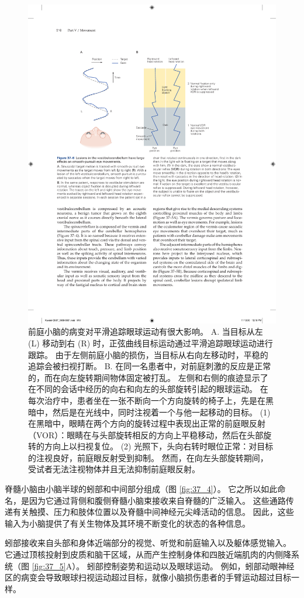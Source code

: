 \begin{figure}[htbp]
	\centering
	\includegraphics[width=0.8\linewidth]{chap37/fig_37_6}
	\caption{前庭小脑的病变对平滑追踪眼球运动有很大影响。 A. 当目标从左 (L) 移动到右 (R) 时，正弦曲线目标运动通过平滑追踪眼球运动进行跟踪。 由于左侧前庭小脑的损伤，当目标从右向左移动时，平稳的追踪会被扫视打断。 B. 在同一名患者中，对前庭刺激的反应是正常的，而在向左旋转期间物体固定被打乱。 左侧和右侧的痕迹显示了在不同的会话中经历的向右和向左的头部旋转引起的眼球运动。 在每次治疗中，患者坐在一张不断向一个方向旋转的椅子上，先是在黑暗中，然后是在光线中，同时注视着一个与他一起移动的目标。 (1) 在黑暗中，眼睛在两个方向的旋转过程中表现出正常的前庭眼反射（VOR）：眼睛在与头部旋转相反的方向上平稳移动，然后在头部旋转的方向上以扫视复位。 (2) 光照下，头向右转时眼位正常：对目标的注视良好，前庭眼反射受到抑制。 然而，在向左头部旋转期间，受试者无法注视物体并且无法抑制前庭眼反射。}
	\label{fig:37_6}
\end{figure}


脊髓小脑由小脑半球的蚓部和中间部分组成（图 \ref{fig:37_4}）。
它之所以如此命名，是因为它通过背侧和腹侧脊髓小脑束接收来自脊髓的广泛输入。
这些通路传递有关触摸、压力和肢体位置以及脊髓中间神经元尖峰活动的信息。
因此，这些输入为小脑提供了有关生物体及其环境不断变化的状态的各种信息。


蚓部接收来自头部和身体近端部分的视觉、听觉和前庭输入以及躯体感觉输入。
它通过顶核投射到皮质和脑干区域，从而产生控制身体和四肢近端肌肉的内侧降系统（图 \ref{fig:37_5}A）。
蚓部控制姿势和运动以及眼球运动。
例如，蚓部动眼神经区的病变会导致眼球扫视运动超过目标，就像小脑损伤患者的手臂运动超过目标一样。



